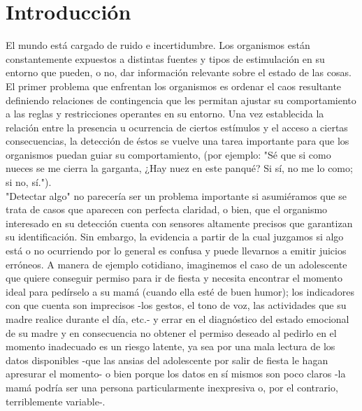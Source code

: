 
\chapter{Introducción} %

\label{Chapter1} %


\newcommand{\keyword}[1]{\textbf{#1}}
\newcommand{\tabhead}[1]{\textbf{#1}}
\newcommand{\code}[1]{\texttt{#1}}
\newcommand{\file}[1]{\texttt{\bfseries#1}}
\newcommand{\option}[1]{\texttt{\itshape#1}}


El mundo está cargado de ruido e incertidumbre. Los organismos están constantemente expuestos a distintas fuentes y tipos de estimulación en su entorno que pueden, o no, dar información relevante sobre el estado de las cosas. El primer problema que enfrentan los organismos es ordenar el caos resultante definiendo relaciones de contingencia que les permitan ajustar su comportamiento a las reglas y restricciones operantes en su entorno. Una vez establecida la relación entre la presencia u ocurrencia de ciertos estímulos y el acceso a ciertas consecuencias, la detección de éstos se vuelve una tarea importante para que los organismos puedan guiar su comportamiento, (por ejemplo: "Sé que si como nueces se me cierra la garganta, ¿Hay nuez en este panqué? Si sí, no me lo como; si no, sí.").\\

"Detectar algo" no parecería ser un problema importante si asumiéramos que se trata de casos que aparecen con perfecta claridad, o bien, que el organismo interesado en su detección cuenta con sensores altamente precisos que garantizan su identificación. Sin embargo, la evidencia a partir de la cual juzgamos si algo está o no ocurriendo por lo general es confusa y puede llevarnos a emitir juicios erróneos. A manera de ejemplo cotidiano, imaginemos el caso de un adolescente que quiere conseguir permiso para ir de fiesta y necesita encontrar el momento ideal para pedírselo a su mamá (cuando ella esté de buen humor); los indicadores con que cuenta son imprecisos -los gestos, el tono de voz, las actividades que su madre realice durante el día, etc.- y errar en el diagnóstico del estado emocional de su madre y en consecuencia no obtener el permiso deseado al pedirlo en el momento inadecuado es un riesgo latente, ya sea por una mala lectura de los datos disponibles -que las ansias del adolescente por salir de fiesta le hagan apresurar el momento- o bien porque los datos en sí mismos son poco claros -la mamá podría ser una persona particularmente inexpresiva o, por el contrario, terriblemente variable-.\\ 

